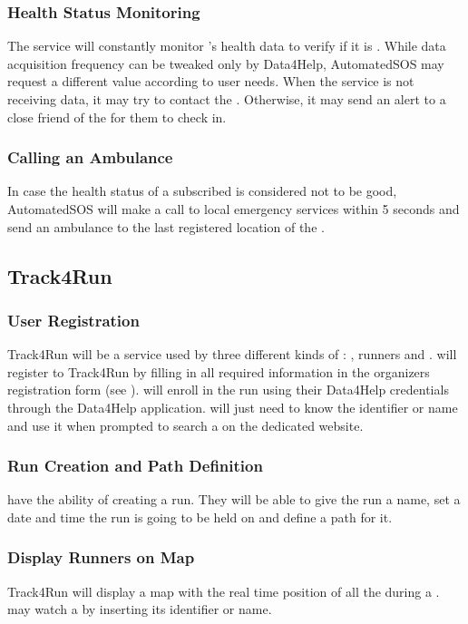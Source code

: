\documentclass[../../rasd.tex]{subfiles}
\begin{document}
				\subsubsection{Health Status Monitoring}
				The service will constantly monitor 's health data to verify if it is . While data acquisition frequency can be tweaked only by Data4Help, AutomatedSOS may request a different value according to user needs.  When the service is not receiving data, it may try to contact the . Otherwise, it may send an alert to a close friend of the  for them to check in.
				
				\subsubsection{Calling an Ambulance} 
				In case the health status of a subscribed  is considered not to be good, AutomatedSOS will make a call to local emergency services within 5 seconds and send an ambulance to the last registered location of the .

			\subsection{Track4Run}
				
				\subsubsection{User Registration}
				Track4Run will be a service used by three different kinds of : , runners and . will register to Track4Run by filling in all required information in the organizers registration form (see ).  will enroll in the run using their Data4Help credentials through the Data4Help application.  will just need to know the  identifier or name and use it when prompted to search a  on the  dedicated website.
				
				\subsubsection{Run Creation and Path Definition}
				 have the ability of creating a run. They will be able to give the run a name, set a date and time the run is going to be held on and define a path for it.
				
				\subsubsection{Display Runners on Map}

				Track4Run will display a map with the real time position of all the  during a .  may watch a  by inserting its identifier or name.
\end{document}
